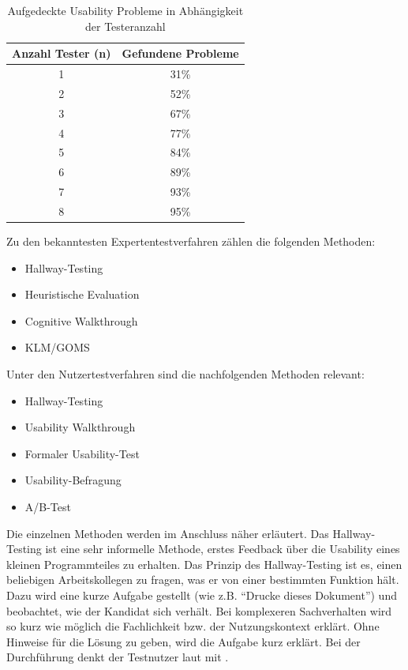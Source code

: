 \begin{table}[H]
 \centering
 \begin{tabular}{|c|c|} \hline
 \textbf{Anzahl Tester (n)} & \textbf{Gefundene Probleme} \\ \hline
 1 & 31\% \\ \hline
 2 & 52\% \\ \hline
 3 & 67\% \\ \hline
 4 & 77\% \\ \hline
 5 & 84\% \\ \hline
 6 & 89\% \\ \hline
 7 & 93\% \\ \hline
 8 & 95\% \\ \hline
 \end{tabular}
 \caption{Aufgedeckte Usability Probleme in Abhängigkeit der Testeranzahl}
 \label{tab:anzahlTester}
\end{table}
Zu den bekanntesten Expertentestverfahren zählen die folgenden Methoden:
\begin{itemize}
 \item Hallway-Testing
 \item Heuristische Evaluation
 \item Cognitive Walkthrough
 \item KLM/GOMS
\end{itemize}
Unter den Nutzertestverfahren sind die nachfolgenden Methoden relevant:
\begin{itemize}
 \item Hallway-Testing
 \item Usability Walkthrough
 \item Formaler Usability-Test
 \item Usability-Befragung
 \item A/B-Test
\end{itemize}
Die einzelnen Methoden werden im Anschluss näher erläutert.
Das Hallway-Testing ist eine sehr informelle Methode, erstes Feedback über die Usability eines kleinen Programmteiles zu erhalten. Das Prinzip des Hallway-Testing ist es, einen beliebigen Arbeitskollegen zu fragen, was er von einer bestimmten Funktion hält. Dazu wird eine kurze Aufgabe gestellt (wie z.B. \enquote{Drucke dieses Dokument}) und beobachtet, wie der Kandidat sich verhält. Bei komplexeren Sachverhalten wird so kurz wie möglich die Fachlichkeit bzw. der Nutzungskontext erklärt. Ohne Hinweise für die Lösung zu geben, wird die Aufgabe kurz erklärt. Bei der Durchführung denkt der Testnutzer laut mit \cite[S. 226]{Moser2012}.
